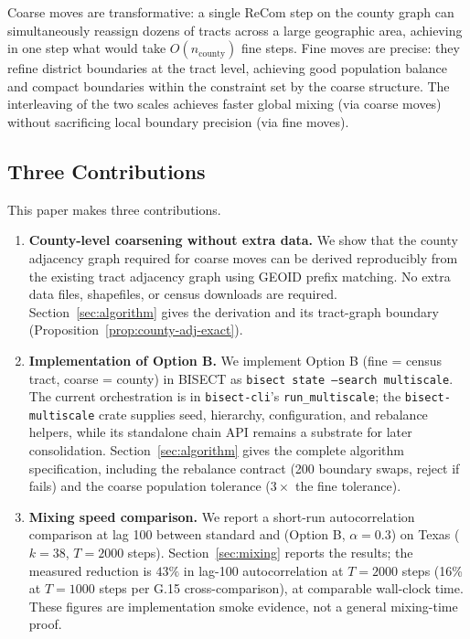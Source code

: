 Coarse moves are transformative: a single ReCom step on the county graph
can simultaneously reassign dozens of tracts across a large geographic area,
achieving in one step what would take $O(n_{\mathrm{county}})$ fine steps.
Fine moves are precise: they refine district boundaries at the tract level,
achieving good population balance and compact boundaries within the
constraint set by the coarse structure.
The interleaving of the two scales achieves faster global mixing (via coarse
moves) without sacrificing local boundary precision (via fine moves).

\subsection{Three Contributions}

This paper makes three contributions.

\begin{enumerate}

  \item \textbf{County-level coarsening without extra data.}
  We show that the county adjacency graph required for coarse \recom{} moves
  can be derived reproducibly from the existing tract adjacency graph using GEOID
  prefix matching.
  No extra data files, shapefiles, or census downloads are required.
  Section~\ref{sec:algorithm} gives the derivation and its tract-graph boundary
  (Proposition~\ref{prop:county-adj-exact}).

  \item \textbf{Implementation of Option B.}
  We implement \ms{} Option B (fine = census tract, coarse = county) in
  BISECT as \texttt{bisect state --search multiscale}. The current
  orchestration is in \texttt{bisect-cli}'s \texttt{run\_multiscale}; the
  \texttt{bisect-multiscale} crate supplies seed, hierarchy, configuration,
  and rebalance helpers, while its standalone chain API remains a substrate
  for later consolidation.
  Section~\ref{sec:algorithm} gives the complete algorithm specification,
  including the rebalance contract (200 boundary swaps, reject if fails)
  and the coarse population tolerance ($3\times$ the fine tolerance).

  \item \textbf{Mixing speed comparison.}
  We report a short-run autocorrelation comparison at lag 100 between standard \recom{} and
  \ms{} (Option B, $\alpha = 0.3$) on Texas ($k = 38$, $T = 2000$ steps).
  Section~\ref{sec:mixing} reports the results; the measured reduction is
  $43\%$ in lag-100 autocorrelation at $T = 2000$ steps (16\% at $T = 1000$
  steps per G.15 cross-comparison), at comparable wall-clock time. These
  figures are implementation smoke evidence, not a general mixing-time proof.

\end{enumerate}

